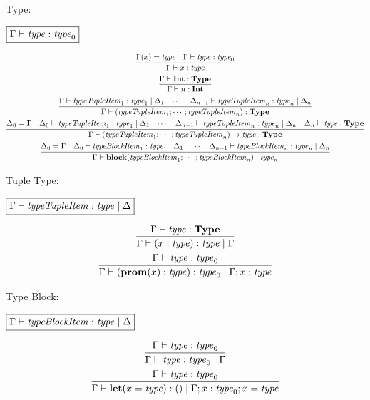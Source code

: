 Type:

$\fbox{$\Gamma \vdash \mathit{type}: \mathit{type}_0$}$

\begin{gather*}
  \infer{\Gamma \vdash x: \mathit{type}}{
    \Gamma(x) = \mathit{type}
    &
    \Gamma \vdash \mathit{type}: \mathit{type}_0
  }
  \\
  \infer{\Gamma \vdash n: \mathbf{Int}}{
    \Gamma \vdash \mathbf{Int}: \mathbf{Type}
  }
  \\
  \infer{\Gamma \vdash (\mathit{typeTupleItem}_1; \cdots; \mathit{typeTupleItem}_n): \mathbf{Type}}{
    \Gamma \vdash \mathit{typeTupleItem}_1: \mathit{type}_1 \mid \Delta_1
    &
    \cdots
    &
    \Delta_{n - 1} \vdash \mathit{typeTupleItem}_n: \mathit{type}_n \mid \Delta_n
  }
  \\
  \infer{\Gamma \vdash (\mathit{typeTupleItem}_1; \cdots; \mathit{typeTupleItem}_n) \rightarrow \mathit{type}: \mathbf{Type}}{
    \Delta_0 = \Gamma
    &
    \Delta_0 \vdash \mathit{typeTupleItem}_1: \mathit{type}_1 \mid \Delta_1
    &
    \cdots
    &
    \Delta_{n - 1} \vdash \mathit{typeTupleItem}_n: \mathit{type}_n \mid \Delta_n
    &
    \Delta_n \vdash \mathit{type}: \mathbf{Type}
  }
  \\
  \infer{\Gamma \vdash \mathbf{block}(\mathit{typeBlockItem}_1; \cdots; \mathit{typeBlockItem}_n): \mathit{type}_n}{
    \Delta_0 = \Gamma
    &
    \Delta_0 \vdash \mathit{typeBlockItem}_1: \mathit{type}_1 \mid \Delta_1
    &
    \cdots
    &
    \Delta_{n - 1} \vdash \mathit{typeBlockItem}_n: \mathit{type}_n \mid \Delta_n
  }
\end{gather*}

Tuple Type:

$\fbox{$\Gamma \vdash \mathit{typeTupleItem}: \mathit{type} \mid \Delta$}$

\begin{gather*}
  \infer{\Gamma \vdash (x: \mathit{type}): \mathit{type} \mid \Gamma}{
    \Gamma \vdash \mathit{type}: \mathbf{Type}
  }
  \\
  \infer{\Gamma \vdash (\mathbf{prom}(x): \mathit{type}): \mathit{type}_0 \mid \Gamma; x: \mathit{type}}{
    \Gamma \vdash \mathit{type}: \mathit{type}_0
  }
\end{gather*}

Type Block:

$\fbox{$\Gamma \vdash \mathit{typeBlockItem}: \mathit{type} \mid \Delta$}$

\begin{gather*}
  \infer{\Gamma \vdash \mathit{type}: \mathit{type}_0 \mid \Gamma}{
    \Gamma \vdash \mathit{type}: \mathit{type}_0
  }
  \\
  \infer{\Gamma \vdash \mathbf{let}(x = \mathit{type}): () \mid \Gamma; x: \mathit{type}_0; x = \mathit{type}}{
    \Gamma \vdash \mathit{type}: \mathit{type}_0
  }
\end{gather*}
